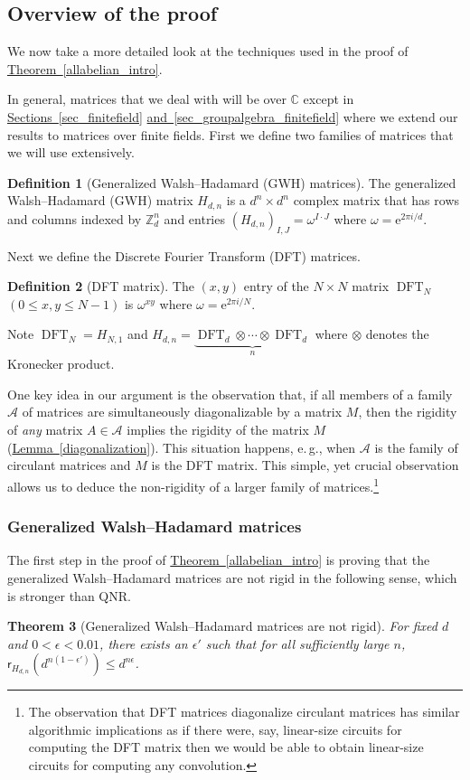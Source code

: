 \documentclass[11pt]{article}
\numberwithin{equation}{section}
\newtheorem{theorem}{Theorem}[section]
\theoremstyle{definition}
\theoremstyle{plain}
\newcommand{\C}{\mathbb C}
\newcommand{\Z}{\mathbb Z}
\newcommand{\eee}{\mathrm e}
\newcommand{\eg}{e.\,g.}
\newcommand{\expref}[2]{\hyperref[#2]{#1~\ref{#2}}}
\theoremstyle{definition}
\newtheorem{define}[theorem]{Definition}
\renewcommand\Z{{\mathbb{Z}}}
\renewcommand\C{{\mathbb{C}}}
\DeclareMathOperator{\DFT}{DFT}
\begin{document}
%
\subsection{Overview of the proof}   %
We now take a more detailed look at the techniques used in the proof of
\expref{Theorem}{allabelian_intro}.

%
In general, matrices that we deal with will be over $\C$ except in
%
%
%
\expref{Sections}{sec_finitefield}          %
\expref{and}{sec_groupalgebra_finitefield}  %
where we extend our results to matrices over finite fields. 
First we define two families of matrices that we will use extensively.
%
%
%
%
\begin{define}[Generalized Walsh--Hadamard (GWH) matrices] \label{def:GWH1}
The generalized Walsh--Hadamard (GWH) matrix $H_{d,n}$ is a $d^n \times d^n$
complex matrix that has rows and columns indexed by $\Z_d^n$ and entries
%
$(H_{d,n})_{I,J} = \omega^{I \cdot J}$ where
%
%
$\omega = \eee^{2 \pi i/d}$.  %
\end{define}
%
%
%
%
%
%

%
Next we define the Discrete Fourier Transform (DFT) matrices. %
\begin{define}[DFT matrix]
The  $(x,y)$ entry of the $N\times N$ matrix $\DFT_N$ \
%
$(0\le x,y\le N-1)$ 
is $\omega^{xy}$ where $\omega=\eee^{2\pi i/N}$.
\end{define}
Note $\DFT_N = H_{N,1}$ and 
$H_{d,n} = \underbrace{\DFT_d \otimes \cdots \otimes \DFT_d}_{\text{$n$}}$  
where $\otimes$ denotes the Kronecker product. 

%
One key idea in our %
argument is the observation that, if all members of a
%
family $\mathcal A$ of matrices are simultaneously
diagonalizable by a matrix $M$, then
the rigidity of \emph{any} matrix $A \in \mathcal A$ implies the rigidity of
the matrix $M$ (\expref{Lemma}{diagonalization}).  %
This situation happens, \eg, when $\mathcal A$ is the family of circulant matrices and $M$ is the DFT matrix. 
This simple, yet crucial observation allows us to deduce the non-rigidity of a larger family of matrices.\footnote{The observation that DFT 
matrices diagonalize circulant matrices has similar algorithmic implications as if there were, say, linear-size    
circuits for computing the DFT matrix then we would be able to obtain
linear-size circuits for computing any convolution.}

\subsubsection{Generalized Walsh--Hadamard matrices} 
The first step in the proof of \expref{Theorem}{allabelian_intro}
is proving that the generalized Walsh--Hadamard matrices are not rigid
%
in the following sense, which is stronger than QNR.  %
%
\begin{theorem}[Generalized Walsh--Hadamard matrices are not rigid]  %
\label{Hadamard_informal}
For fixed $d$ and $0 < \epsilon < 0.01$, there exists an $\epsilon'$ such that for all sufficiently large $n$,  $\textsf{r}_{H_{d,n}}\left( d^{n(1 - \epsilon')} \right) \leq d^{n\epsilon}$. \end{theorem}
\end{document}
